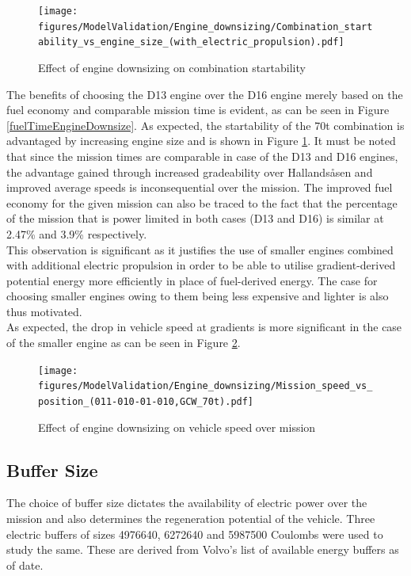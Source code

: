\documentclass[ExampleMasters.tex]{subfiles}
\begin{document}
\begin{figure}[h!]
\centering
\texttt{[image: figures/ModelValidation/Engine\_downsizing/Combination\_startability\_vs\_engine\_size\_(with\_electric\_propulsion).pdf]}
\caption{Effect of engine downsizing on combination startability}
\label{startabilityEngineDownsize}
\end{figure}

The benefits of choosing the D13 engine over the D16 engine merely based on the fuel economy and comparable mission time is evident, as can be seen in Figure \ref{fuelTimeEngineDownsize}. As expected, the startability of the 70t combination is advantaged by increasing engine size and is shown in Figure \ref{startabilityEngineDownsize}. It must be noted that since the mission times are comparable in case of the D13 and D16 engines, the advantage gained through increased gradeability over Hallands\aa sen and improved average speeds is inconsequential over the mission. The improved fuel economy for the given mission can also be traced to the fact that the percentage of the mission that is power limited in both cases (D13 and D16)  is similar at 2.47\% and 3.9\% respectively.\\

This observation is significant as it justifies the use of smaller engines combined with additional electric propulsion in order to be able to utilise gradient-derived potential energy more efficiently in place of fuel-derived energy. The case for choosing smaller engines owing to them being less expensive and lighter is also thus motivated.\\

As expected, the drop in vehicle speed at gradients is more significant in the case of the smaller engine as can be seen in Figure \ref{speedEngineDownsizing}.\\

\begin{figure}[h!]
\centering
\texttt{[image: figures/ModelValidation/Engine\_downsizing/Mission\_speed\_vs\_position\_(011-010-01-010,GCW\_70t).pdf]}
\caption{Effect of engine downsizing on vehicle speed over mission}
\label{speedEngineDownsizing}
\end{figure}

\subsection{Buffer Size}

The choice of buffer size dictates the availability of electric power over the mission and also determines the regeneration potential of the vehicle. Three electric buffers of sizes 4976640, 6272640 and 5987500 Coulombs were used to study the same. These are derived from Volvo's list of available energy buffers as of date.
\end{document}
